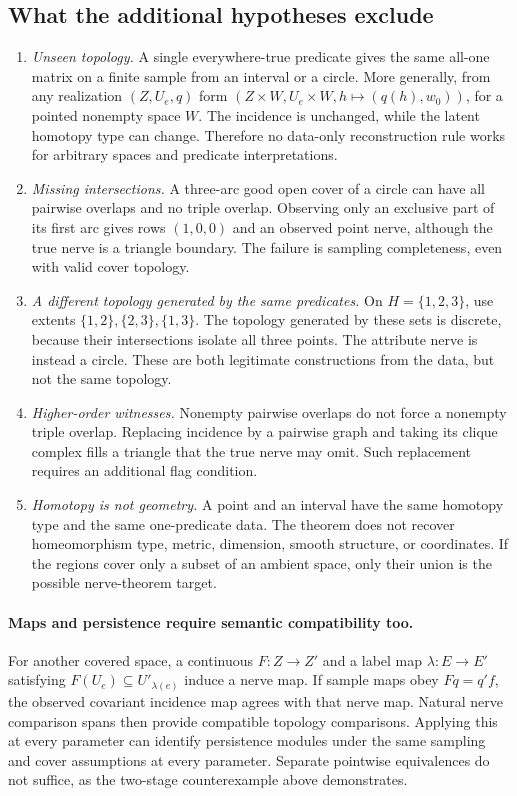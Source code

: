 \documentclass[11pt]{article}
\theoremstyle{remark}
\begin{document}
\subsection{What the additional hypotheses exclude}
\begin{enumerate}
\item \emph{Unseen topology.} A single everywhere-true predicate gives
the same all-one matrix on a finite sample from an interval or a circle.
More generally, from any realization $(Z,U_e,q)$ form
$(Z\times W,U_e\times W,h\mapsto(q(h),w_0))$, for a pointed nonempty
space $W$. The incidence is unchanged, while the latent homotopy type
can change. Therefore no data-only reconstruction rule works for arbitrary
spaces and predicate interpretations.
\item \emph{Missing intersections.} A three-arc good open cover of a
circle can have all pairwise overlaps and no triple overlap. Observing
only an exclusive part of its first arc gives rows $(1,0,0)$ and an
observed point nerve, although the true nerve is a triangle boundary.
The failure is sampling completeness, even with valid cover topology.
\item \emph{A different topology generated by the same predicates.}
On $H=\{1,2,3\}$, use extents $\{1,2\},\{2,3\},\{1,3\}$. The topology
generated by these sets is discrete, because their intersections isolate
all three points. The attribute nerve is instead a circle. These are
both legitimate constructions from the data, but not the same topology.
\item \emph{Higher-order witnesses.} Nonempty pairwise overlaps do not
force a nonempty triple overlap. Replacing incidence by a pairwise graph
and taking its clique complex fills a triangle that the true nerve may
omit. Such replacement requires an additional flag condition.
\item \emph{Homotopy is not geometry.} A point and an interval have the
same homotopy type and the same one-predicate data. The theorem does not
recover homeomorphism type, metric, dimension, smooth structure, or
coordinates. If the regions cover only a subset of an ambient space,
only their union is the possible nerve-theorem target.
\end{enumerate}

\paragraph{Maps and persistence require semantic compatibility too.}
For another covered space, a continuous $F:Z\to Z'$ and a label map
$\lambda:E\to E'$ satisfying $F(U_e)\subseteq U'_{\lambda(e)}$ induce
a nerve map. If sample maps obey $Fq=q'f$, the observed covariant
incidence map agrees with that nerve map. Natural nerve comparison spans
then provide compatible topology comparisons. Applying this at every
parameter can identify persistence modules under the same sampling and
cover assumptions at every parameter. Separate pointwise equivalences do
not suffice, as the two-stage counterexample above demonstrates.
\end{document}
